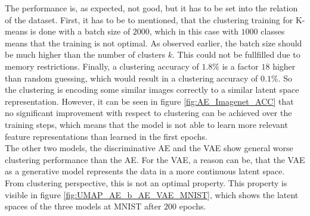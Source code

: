 \documentclass[12pt,DIV14,BCOR12mm,a4paper,footexclude,headinclude,halfparskip-,twoside,openright,cleardoubleempty,idxtotoc,bibtotoc,listtotoc,abstracton]{scrreprt} %
\numberwithin{equation}{chapter}
\begin{document}
The performance is, as expected, not good, but it has to be set into the relation of the dataset. First, it has to be to mentioned, that the clustering training for K-means is done with a batch size of $2000$, which in this case with $1000$ classes means that the training is not optimal. As observed earlier, the batch size should be much higher than the number of clusters $k$. This could not be fullfilled due to memory restrictions. Finally, a clustering accuracy of $1.8\%$ is a factor $18$ higher than random guessing, which would result in a clustering accuracy of $0.1\%$. So the clustering is encoding some similar images correctly to a similar latent space representation. However, it can be seen in figure \ref{fig:AE_Imagenet_ACC} that no significant improvement with respect to clustering can be achieved over the training steps, which means that the model is not able to learn more relevant feature representations than learned in the first epochs.\\
The other two models, the discriminative AE and the VAE show general worse clustering performance than the AE. For the VAE, a reason can be, that the VAE as a generative model represents the data in a more continuous latent space. From clustering perspective, this is not an optimal property. This property is visible in figure \ref{fig:UMAP_AE_b_AE_VAE_MNIST}, which shows the latent spaces of the three models at MNIST after 200 epochs.
\end{document}
